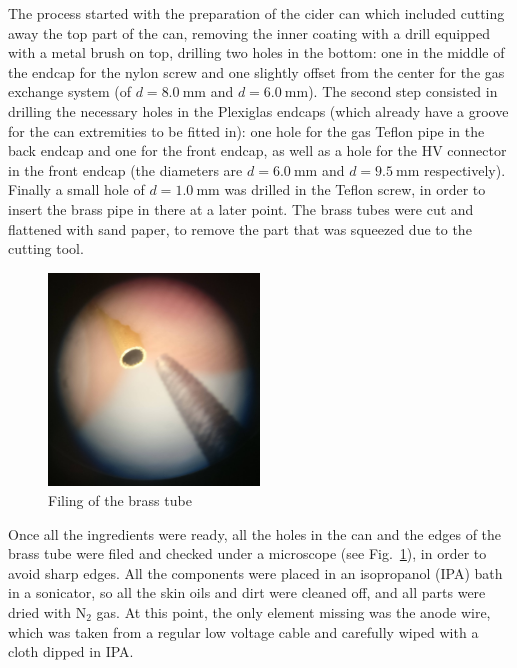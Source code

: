 The process started with the preparation of the cider can which included cutting
away the top part of the can, removing the inner coating with a drill equipped with a
metal brush on top, drilling two holes in the bottom: one in the middle of the
endcap for the nylon screw and one slightly offset from the center for the
gas exchange system (of $d = \SI{8.0}{\milli\meter}$ and $d =
\SI{6.0}{\milli\meter}$). The second step consisted in drilling the necessary
holes in the Plexiglas endcaps (which already have a groove for the can
extremities to be fitted in): one hole for the gas Teflon pipe in the back
endcap and one for the front endcap, as well as a hole for the HV connector in the
front endcap (the diameters are $d = \SI{6.0}{\milli\meter}$ and $d =
\SI{9.5}{\milli\meter}$ respectively). Finally a small hole of $d =
\SI{1.0}{\milli\meter}$ was drilled in the Teflon screw, in order to insert the
brass pipe in there at a later point. The brass tubes were cut and flattened
with sand paper, to remove the part that was squeezed due to the cutting tool.

\begin{figure}[htb]
  \centering
  \includegraphics[width=0.5\textwidth]{./graphics/brass_file.jpg}
  \caption{Filing of the brass tube}
  \label{fig:brass_file}
\end{figure}


Once all the ingredients were ready, all the holes in the can and the edges of
the brass tube were filed and checked under a microscope (see Fig.~\ref{fig:brass_file}), in order to avoid
sharp edges. All the components were placed in an isopropanol (IPA) bath in a
sonicator, so all the skin oils and dirt were cleaned off, and all parts were
dried with $\mathrm{N}_2$ gas. At this point, the only element missing was the
anode wire, which was taken from a regular low voltage cable and carefully wiped
with a cloth dipped in IPA.


